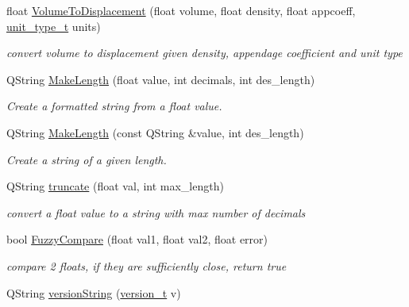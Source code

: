 \begin{DoxyCompactItemize}
float \hyperlink{namespaceShipCAD_ad3ca198e79658bf065f1c1c416f23670}{Volume\-To\-Displacement} (float volume, float density, float appcoeff, \hyperlink{namespaceShipCAD_ac6a7a28b4b063771afae92decb602da5}{unit\-\_\-type\-\_\-t} units)
\begin{DoxyCompactList}\small\item\em convert volume to displacement given density, appendage coefficient and unit type \end{DoxyCompactList}\item 
Q\-String \hyperlink{namespaceShipCAD_ae378a523725f5718c9f2b55103f08dcb}{Make\-Length} (float value, int decimals, int des\-\_\-length)
\begin{DoxyCompactList}\small\item\em Create a formatted string from a float value. \end{DoxyCompactList}\item 
Q\-String \hyperlink{namespaceShipCAD_ab520595d533b1626c8be82c0efd24e6d}{Make\-Length} (const Q\-String \&value, int des\-\_\-length)
\begin{DoxyCompactList}\small\item\em Create a string of a given length. \end{DoxyCompactList}\item 
Q\-String \hyperlink{namespaceShipCAD_a83d943939c1d84473bb904360116f7be}{truncate} (float val, int max\-\_\-length)
\begin{DoxyCompactList}\small\item\em convert a float value to a string with max number of decimals \end{DoxyCompactList}\item 
bool \hyperlink{namespaceShipCAD_ae1b7d6603b6c5a2969befdbd629f2e8b}{Fuzzy\-Compare} (float val1, float val2, float error)
\begin{DoxyCompactList}\small\item\em compare 2 floats, if they are sufficiently close, return true \end{DoxyCompactList}\item 
Q\-String \hyperlink{namespaceShipCAD_a2901c6bb3e9ddd7efa9bdcc9095cc468}{version\-String} (\hyperlink{namespaceShipCAD_af3a6fa23a7318acbda7b0066b53d694f}{version\-\_\-t} v)
\end{DoxyCompactItemize}
